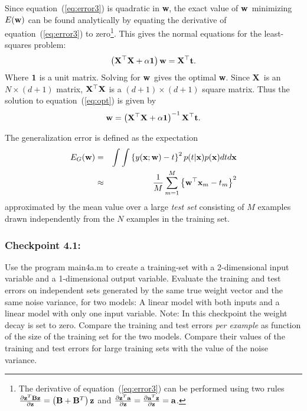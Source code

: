 \documentclass[times,12pt]{article}    %
\def\x{{\bf x}}
\def\X{{\bf X}}
\def\w{{\bf w}}
\def\t{{\bf t}}
\def\z{{\bf z}}
\begin{document}
Since equation~(\ref{eq:error3}) is quadratic in \w, the exact value
of \w\ minimizing $E(\w)$ can be found analytically by equating the
derivative of equation~(\ref{eq:error3}) to zero\footnote{The derivative of equation~(\ref{eq:error3}) can be performed using two rules $\frac{{\partial {\z}^T {\bf Bz}}}{{\partial {\z}}} = \left( {{\bf B} + {\bf B}^T } \right){\z}
$ and $\frac{{\partial {\z}^T {\bf a}}}{{\partial {\z}}} = \frac{{\partial {\bf a}^T {\z}}}{{\partial {\z}}} =  {\bf a}$.}. This gives the
normal equations for the least-squares problem:
\begin{equation}
  \label{eq:opt}
  \left(\X^\top \X + \alpha {\bf 1}\right) \w = \X^\top \t.
\end{equation}
Where ${\bf 1}$ is a unit matrix. Solving for \w\ gives the optimal \w.
Since \X\ is an $N\times (d+1)$ matrix, $\X^\top \X$ is a $(d+1)\times
(d+1)$ square matrix. Thus the solution to equation~(\ref{eq:opt}) is
given by
\begin{equation}
  \label{eq:sol}
  \w = \left(\X^\top \X +\alpha {\bf 1}\right)^{-1} \X^\top \t.
\end{equation}

The generalization error is defined as the expectation
\begin{eqnarray}
  \label{eq:gen1}
  E_G(\w) &=& \int\int \left\{ y(\x;\w)-t \right\}^2 p(t|\x)p(\x)dtd\x\\
  \label{eq:gen2}
       &\approx&  \frac{1}{M} \sum_{m=1}^M \left\{ \w^\top\x_m -t_m  \right\}^2
\end{eqnarray}
approximated by the mean value over a large {\it test set} consisting of $M$ examples
drawn independently from the $N$ examples in the training set.


\subsubsection*{Checkpoint 4.1:}
Use the program {\sf main4a.m} to create a training-set with a
2-dimensional input variable and a 1-dimensional output
variable. Evaluate the training and test errors on independent sets generated by the
same true weight vector and the same noise variance, for two models: A linear model with both inputs and a linear model with only one input
 variable. Note: In this checkpoint the weight decay is set
to zero. Compare the training and test errors {\it per example}
as function of the size of the training set for the two models. Compare their values of the training and test
errors for large training sets with the value of the noise variance.
\end{document}
